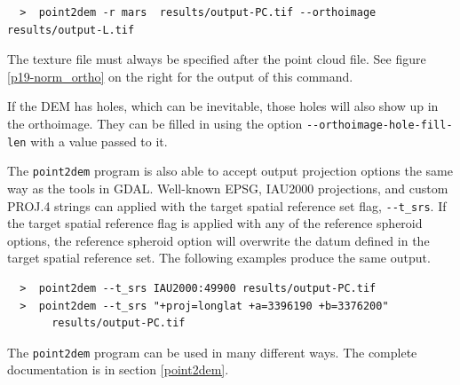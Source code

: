 \begin{verbatim}
  >  point2dem -r mars  results/output-PC.tif --orthoimage results/output-L.tif
\end{verbatim}

The texture file must always be specified after the point cloud
file. See figure \ref{p19-norm_ortho} on the right for the output of
this command.

If the DEM has holes, which can be inevitable, those holes will also
show up in the orthoimage. They can be filled in using the option
\texttt{-\/-orthoimage-hole-fill-len} with a value passed to it.

The \texttt{point2dem} program is also able to accept output
projection options the same way as the tools in GDAL. Well-known EPSG,
IAU2000 projections, and custom PROJ.4 strings can applied with the
target spatial reference set flag, \texttt{-\/-t\_srs}. If the target
spatial reference flag is applied with any of the reference spheroid
options, the reference spheroid option will overwrite the datum
defined in the target spatial reference set. The following examples
produce the same output.

\begin {verbatim}
  >  point2dem --t_srs IAU2000:49900 results/output-PC.tif
  >  point2dem --t_srs "+proj=longlat +a=3396190 +b=3376200"
       results/output-PC.tif
\end{verbatim}

The \texttt{point2dem} program can be used in many different ways. The
complete documentation is in section \ref{point2dem}.

